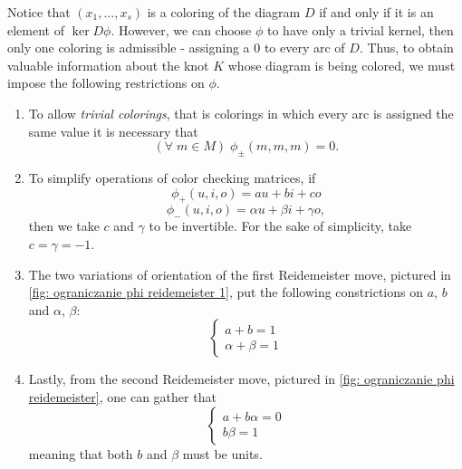 Notice that $(x_1,..., x_s)$ is a coloring of the diagram $D$ if and only if it is an element of $\ker D\phi$. However, we can choose $\phi$ to have only a trivial kernel, then only one coloring is admissible - assigning a $0$ to every arc of $D$. Thus, to obtain valuable information about the knot $K$ whose diagram is being colored, we must impose the following restrictions on $\phi$.

\begin{enumerate}
  \item To allow \emph{trivial colorings}, that is colorings in which every arc is assigned the same value it is necessary that
    $$(\forall\;m\in M)\;\phi_\pm(m,m,m)=0.$$
  \item To simplify operations of color checking matrices, if
    $$\phi_+(u, i, o)=au+bi+co$$
    $$\phi_-(u,i,o)=\alpha u+\beta i+\gamma o,$$
    then we take $c$ and $\gamma$ to be invertible. For the sake of simplicity, take $c=\gamma=-1$.
  \item The two variations of orientation of the first Reidemeister move, pictured in \cref{fig: ograniczanie phi reidemeister 1}, put the following constrictions on $a$, $b$ and $\alpha$, $\beta$:
    $$\begin{cases}
      a+b=1\\
      \alpha+\beta=1
    \end{cases}$$
  \item Lastly, from the second Reidemeister move, pictured in \cref{fig: ograniczanie phi reidemeister}, one can gather that  
    $$\begin{cases}
      a+b\alpha=0\\ 
      b\beta=1
    \end{cases}$$
    meaning that both $b$ and $\beta$ must be units.
\end{enumerate}

